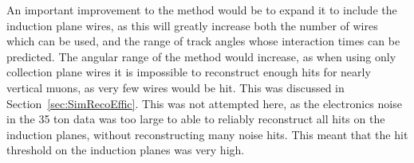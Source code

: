 An important improvement to the method would be to expand it to include the induction plane wires, as this will greatly increase both the number of wires which can be used, and the range of track angles whose interaction times can be predicted. The angular range of the method would increase, as when using only collection plane wires it is impossible to reconstruct enough hits for nearly vertical muons, as very few wires would be hit. This was discussed in Section~\ref{sec:SimRecoEffic}. This was not attempted here, as the electronics noise in the 35 ton data was too large to able to reliably reconstruct all hits on the induction planes, without reconstructing many noise hits. This meant that the hit threshold on the induction planes was very high. \\
